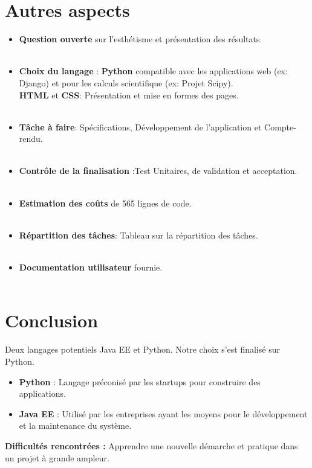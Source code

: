 	\section{Autres aspects}
	\begin{frame}
		\begin{itemize}
		\item \textbf{Question ouverte} sur l'esthétisme et présentation des résultats.\\~\\
		\pause
		\item \textbf{Choix du langage} : \textbf{Python} compatible avec les applications web (ex: Django) et pour les calculs scientifique (ex: Projet Scipy). \\
		\textbf{HTML} et \textbf{CSS}: Présentation et mise en formes des pages.\\~\\
		\pause
		\item \textbf{Tâche à faire}: Spécifications, Développement de l'application et Compte-rendu.\\~\\
		\pause
		\item \textbf{Contrôle de la finalisation} :Test Unitaires, de validation et acceptation.\\~\\
		\pause
		\item \textbf{Estimation des coûts} de 565 lignes de code.\\~\\
		\pause
		\item \textbf{Répartition des tâches}: Tableau sur la répartition des tâches.\\~\\
		\pause
		\item \textbf{Documentation utilisateur} fournie.\\~\\
		
		
		\end{itemize}
	\end{frame}
	
	\section{Conclusion}
	\begin{frame}
		Deux langages potentiels Java EE et Python. Notre choix s'est finalisé sur Python.
		\begin{itemize}
		\pause
		\item \textbf{Python} : Langage préconisé par les startups pour construire des applications. 
		\pause
		\item \textbf{Java EE} : Utilisé par les entreprises ayant les moyens pour le développement et la maintenance du système.
		\end{itemize}
		\pause
		\textbf{Difficultés rencontrées :}  Apprendre une nouvelle démarche et pratique dans un projet à grande ampleur.\\
	\end{frame}	
	
